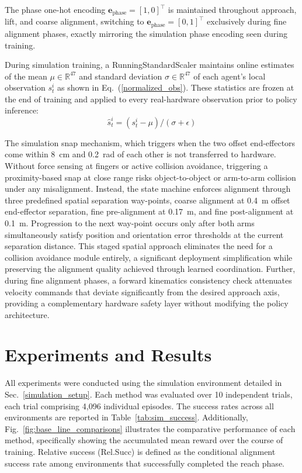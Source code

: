 \documentclass[a4paper,fleqn]{cas-dc}
\begin{document}
The phase one-hot encoding $\mathbf{e}_{\text{phase}} = [1, 0]^\top$ is maintained throughout approach, lift, and coarse alignment, switching to $\mathbf{e}_{\text{phase}} = [0, 1]^\top$ exclusively during fine alignment phases, exactly mirroring the simulation phase encoding seen during training.

During simulation training, a RunningStandardScaler maintains online estimates of the mean $\mu \in \mathbb{R}^{47}$ and standard deviation $\sigma \in \mathbb{R}^{47}$ of each agent's local observation $s_t^i$ as shown in Eq.~(\ref{normalized_obs}). These statistics are frozen at the end of training and applied to every real-hardware observation prior to policy inference:
\begin{equation}
    \hat{s}^{i}_{t} = (s^{i}_{t} - \mu)/(\sigma + \epsilon)
    \label{normalized_obs}
\end{equation}

The simulation snap mechanism, which triggers when the two offset end-effectors come within 8~cm and 0.2~rad of each other is not transferred to hardware. Without force sensing at fingers or active collision avoidance, triggering a proximity-based snap at close range risks object-to-object or arm-to-arm collision under any misalignment. Instead, the state machine enforces alignment through three predefined spatial separation way-points, coarse alignment at 0.4~m offset end-effector separation, fine pre-alignment at 0.17~m, and fine post-alignment at 0.1~m. Progression to the next way-point occurs only after both arms simultaneously satisfy position and orientation error thresholds at the current separation distance. This staged spatial approach eliminates the need for a collision avoidance module entirely, a significant deployment simplification while preserving the alignment quality achieved through learned coordination. Further, during fine alignment phases, a forward kinematics consistency check attenuates velocity commands that deviate significantly from the desired approach axis, providing a complementary hardware safety layer without modifying the policy architecture.

\section{Experiments and Results}
\label{results_and_discussion}
All experiments were conducted using the simulation environment detailed in Sec.~\ref{simulation_setup}. Each method was evaluated over 10 independent trials, each trial comprising 4,096 individual episodes. The success rates across all environments are reported in Table~\ref{tab:sim_success}. Additionally, Fig.~\ref{fig:base_line_comparisons} illustrates the comparative performance of each method, specifically showing the accumulated mean reward over the course of training. Relative success (Rel.Succ) is defined as the conditional alignment success rate among environments that successfully completed the reach phase.
\end{document}
